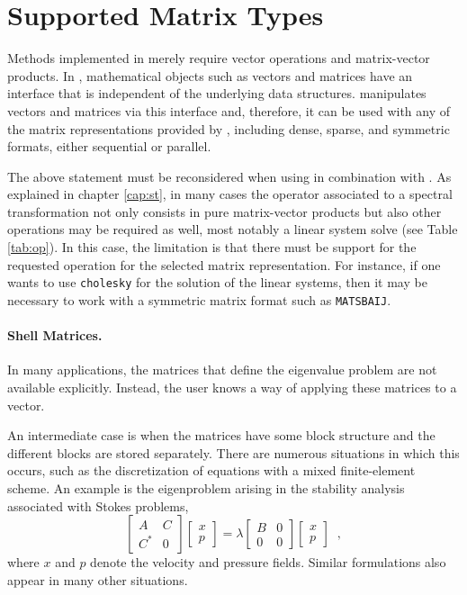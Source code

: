 \section{Supported Matrix Types}
\label{sec:supported}

	Methods implemented in  merely require vector operations and matrix-vector products. In \petsc, mathematical objects such as vectors and matrices have an interface that is independent of the underlying data structures. \slepc manipulates vectors and matrices via this interface and, therefore, it can be used with any of the matrix representations provided by \petsc, including dense, sparse, and symmetric formats, either sequential or parallel.

	The above statement must be reconsidered when using  in combination with . As explained in chapter \ref{cap:st}, in many cases the operator associated to a spectral transformation not only consists in pure matrix-vector products but also other operations may be required as well, most notably a linear system solve (see Table \ref{tab:op}). In this case, the limitation is that there must be support for the requested operation for the selected matrix representation. For instance, if one wants to use \texttt{cholesky} for the solution of the linear systems, then it may be necessary to work with a symmetric matrix format such as \texttt{MATSBAIJ}.

\paragraph{Shell Matrices.}

	In many applications, the matrices that define the eigenvalue problem are not available explicitly. Instead, the user knows a way of applying these matrices to a vector.

	An intermediate case is when the matrices have some block structure and the different blocks are stored separately. There are numerous situations in which this occurs, such as the discretization of equations with a mixed finite-element scheme. An example is the eigenproblem arising in the stability analysis associated with Stokes problems,
\begin{equation}
\left[\begin{array}{cc}A & C\\C^* & 0\end{array}\right]\left[\begin{array}{c}x\\p\end{array}\right]
=\lambda\left[\begin{array}{cc}B & 0\\0 & 0\end{array}\right]\left[\begin{array}{c}x\\p\end{array}\right]\;\;,
\end{equation}
where $x$ and $p$ denote the velocity and pressure fields. Similar formulations also appear in many other situations.

